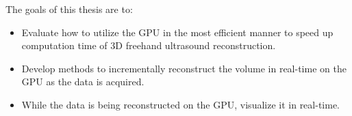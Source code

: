 

The goals of this thesis are to:

\begin{itemize}
	\item Evaluate how to utilize the GPU in the most efficient manner to speed up computation time of 3D freehand ultrasound reconstruction.
	\item Develop methods to incrementally reconstruct the volume in real-time on the GPU as the data is acquired.
	\item While the data is being reconstructed on the GPU, visualize it in real-time.
\end{itemize}
